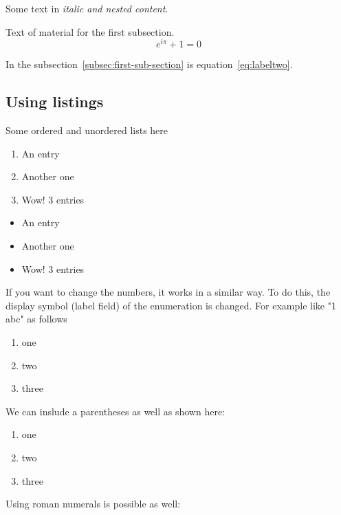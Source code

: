 \documentclass[12]{article}
\begin{document}
    Some text in \textit{italic and \textit{nested} content}.

    Text of material for the first subsection.
    \begin{equation}
      e^{i\pi}+1 = 0
    \label{eq:labeltwo}
    \end{equation}

    In the subsection~\ref{subsec:first-sub-section} is equation~\ref{eq:labeltwo}.

    \subsection{Using listings}%
    \label{sub:listings}
    Some ordered and unordered lists here

    \begin{enumerate}
        \item An entry
        \item Another one
        \item Wow! 3 entries
    \end{enumerate}

    \begin{itemize}
        \item An entry
        \item Another one
        \item Wow! 3 entries
    \end{itemize}

    If you want to change the numbers, it works in a similar way. To do this, the display symbol (label field) of the enumeration is changed. For example like "1 abc" as follows

    \renewcommand{\labelenumi}{\alph{enumi}}
    \begin{enumerate}
    \item one
    \item two
    \item three
    \end{enumerate}

    We can inslude a parentheses as well as shown here:

    \renewcommand{\labelenumi}{\alph{enumi})}
    \begin{enumerate}
    \item one
    \item two
    \item three
    \end{enumerate}

    Using \textrm{roman} numerals is possible as well:
\end{document}
